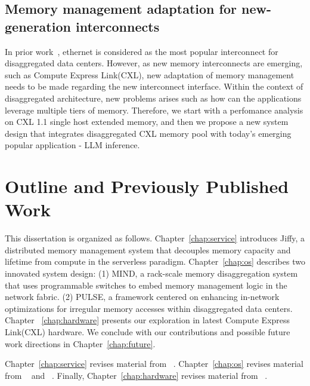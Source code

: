 \subsection{Memory management adaptation for new-generation interconnects}
In prior work~\cite{mind,legoos}, ethernet is considered as the most popular interconnect for disaggregated data centers. However, as new memory interconnects are emerging, such as Compute Express Link(CXL), new adaptation of memory management needs to be made regarding the new interconnect interface. Within the context of disaggregated architecture, new problems arises such as how can the applications leverage multiple tiers of memory. Therefore, we start with a perfomance analysis on CXL 1.1 single host extended memory, and then we propose a new system design that integrates disaggregated CXL memory pool with today's emerging popular application - LLM inference.

\section{Outline and Previously Published Work}

This dissertation is organized as follows. Chapter~\ref{chap:service} introduces Jiffy, a distributed memory management system that decouples memory capacity and lifetime from compute in the serverless paradigm. Chapter~\ref{chap:os} describes two innovated system design: (1) MIND, a rack-scale memory disaggregation system that uses programmable switches to embed memory management logic in
the network fabric. (2) PULSE, a framework centered on enhancing in-network optimizations for
irregular memory accesses within disaggregated data centers. Chapter ~\ref{chap:hardware} presents our exploration in latest Compute Express Link(CXL) hardware. We conclude with our contributions and possible future work directions in Chapter~\ref{chap:future}.

Chapter~\ref{chap:service} revises material from ~\cite{jiffy}. Chapter~\ref{chap:os} revises material from ~\cite{mind} and ~\cite{chase}. Finally, Chapter~\ref{chap:hardware} revises material from ~\cite{cxleurosys}.
